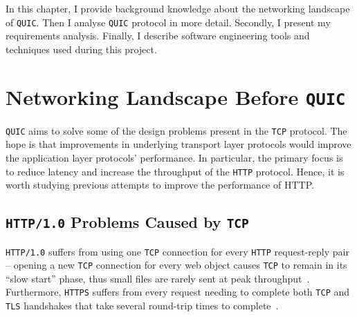 \documentclass[12pt,a4paper]{report}
\begin{document}


In this chapter, I provide background knowledge about the networking landscape of \texttt{QUIC}. 
Then I analyse \texttt{QUIC} protocol in more detail.
Secondly, I present my requirements analysis.
Finally, I describe software engineering tools and techniques used during this project.


\section{Networking Landscape Before \texttt{QUIC}} \label{Networking_Landscape_Before_QUIC}
    \texttt{QUIC} aims to solve some of the design problems present in the \texttt{TCP} protocol. The hope is that improvements in underlying transport layer protocols would improve the application layer protocols' performance.
    In particular, the primary focus is to reduce latency and increase the throughput of the \texttt{HTTP} protocol.
    Hence, it is worth studying previous attempts to improve the performance of HTTP.


\subsection{\texttt{HTTP/1.0} Problems Caused by \texttt{TCP}}
    \texttt{HTTP/1.0} suffers from using one \texttt{TCP} connection for every \texttt{HTTP} request-reply pair \cite{TCP_IP_Guide_Book, HTTP_3_the_past_the_present_and_the_future} --
    opening a new \texttt{TCP} connection for every web object causes \texttt{TCP} to remain in its \enquote{slow start} phase, thus small files are rarely sent at peak throughput~\cite{HTTP_3_the_past_the_present_and_the_future}.
    Furthermore, \texttt{HTTPS} suffers from every request needing to complete both \texttt{TCP} and \texttt{TLS} handshakes that take several round-trip times to complete~\cite{HTTP_3_the_past_the_present_and_the_future}.
\end{document}
